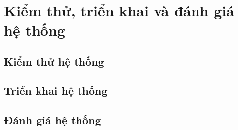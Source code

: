 \chapter{Kiểm thử, triển khai và đánh giá hệ thống} \label{chapter:test_deploy_evaluation}
\section{Kiểm thử hệ thống}

\section{Triển khai hệ thống}


\section{Đánh giá hệ thống}
